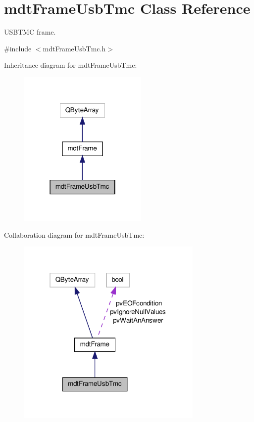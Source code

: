 \hypertarget{classmdt_frame_usb_tmc}{\section{mdt\-Frame\-Usb\-Tmc Class Reference}
\label{classmdt_frame_usb_tmc}
}


U\-S\-B\-T\-M\-C frame.  




{\ttfamily \#include $<$mdt\-Frame\-Usb\-Tmc.\-h$>$}



Inheritance diagram for mdt\-Frame\-Usb\-Tmc\-:\nopagebreak
\begin{figure}[H]
\begin{center}
\leavevmode
\includegraphics[width=178pt]{classmdt_frame_usb_tmc__inherit__graph}
\end{center}
\end{figure}


Collaboration diagram for mdt\-Frame\-Usb\-Tmc\-:\nopagebreak
\begin{figure}[H]
\begin{center}
\leavevmode
\includegraphics[width=256pt]{classmdt_frame_usb_tmc__coll__graph}
\end{center}
\end{figure}
